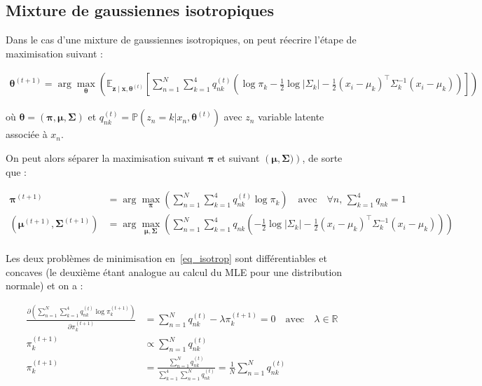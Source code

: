 \documentclass[12pt,a4paper,onecolumn]{article}
\begin{document}
\subsection{Mixture de gaussiennes isotropiques}

Dans le cas d'une mixture de gaussiennes isotropiques, on peut réecrire l'étape de maximisation suivant :

\begin{equation}
	\begin{split}
		\bm{\theta}^{(t + 1)} = \operatorname{arg}\max_{\bm{\theta}}\left(\mathbb{E}_{\bm{z} \mid \bm{x}, \bm{\theta}^{(t)}}\left[\sum_{n = 1}^N\sum_{k = 1}^4q_{nk}^{(t)}\left(\log\pi_k -
		\frac{1}{2}\log|\Sigma_k|-\frac{1}{2}\left(x_i - \mu_k\right)^{\intercal}\Sigma_k^{-1}\left(x_i - \mu_k\right)\right)\right]\right)
	\end{split}
\end{equation}

où \(\bm{\theta} = \left(\bm{\pi}, \bm{\mu}, \bm{\Sigma}\right)\) et \(q_{nk}^{(t)} = \mathbb{P}\left(z_n = k | x_n, \bm{\theta}^{(t)}\right)\) avec \(z_n\) variable latente associée à \(x_n\).

On peut alors séparer la maximisation suivant \(\bm{\pi}\) et suivant \(\left(\bm{\mu}, \bm{\Sigma})\right)\), de sorte que :

\begin{equation}
	\begin{split}
		\bm{\pi}^{(t + 1)} &= \operatorname{arg}\max_{\bm{\pi}}\left(\sum_{n = 1}^N\sum_{k = 1}^4q_{nk}^{(t)}\log\pi_k\right) \quad \text{avec}\quad\forall n,\,\sum_{k = 1}^4q_{nk} = 1\\
		(\bm{\mu}^{(t + 1)}, \bm{\Sigma}^{(t + 1)}) &= \operatorname{arg}\max_{\bm{\mu}, \bm{\Sigma}}\left(\sum_{n = 1}^N\sum_{k = 1}^4q_{nk}\left(
		-\frac{1}{2}\log|\Sigma_k|-\frac{1}{2}\left(x_i - \mu_k\right)^{\intercal}\Sigma_k^{-1}\left(x_i - \mu_k\right)\right)\right)\\
	\end{split}
	\label{eq_isotrop}
\end{equation}

Les deux problèmes de minimisation en~\eqref{eq_isotrop} sont différentiables et concaves (le deuxième étant analogue au calcul du MLE pour une distribution normale) et on a :

\begin{equation}
	\begin{split}
		\frac{\partial\left(\sum_{n = 1}^N\sum_{k = 1}^4q_{nk}^{(t)}\log\pi_k^{(t+1)}\right)}{\partial\pi_k^{(t+1)}} &= \sum_{n = 1}^Nq_{nk}^{(t)} - \lambda \pi_k^{(t+1)} = 0 \quad \text{avec} \quad \lambda \in \mathbb{R}\\
		\pi_k^{(t+1)} &\propto \sum_{n = 1}^Nq_{nk}^{(t)}\\
		\pi_k^{(t+1)} &= \frac{\sum_{n = 1}^Nq_{nk}^{(t)}}{\sum_{k = 1}^4\sum_{n = 1}^Nq_{nk}^{(t)}} = \frac{1}{N}\sum_{n = 1}^Nq_{nk}^{(t)}
	\end{split}
\end{equation}
\end{document}
